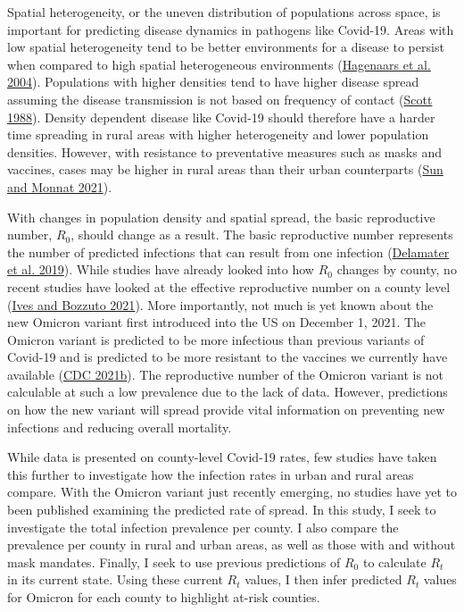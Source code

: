 \documentclass[
  12pt,
]{article}
\begin{document}
Spatial heterogeneity, or the uneven distribution of populations across space, is important for predicting disease dynamics in pathogens like Covid-19. Areas with low spatial heterogeneity tend to be better environments for a disease to persist when compared to high spatial heterogeneous environments (\protect\hyperlink{ref-hagenaars_spatial_2004}{Hagenaars et al. 2004}). Populations with higher densities tend to have higher disease spread assuming the disease transmission is not based on frequency of contact (\protect\hyperlink{ref-scott_impact_1988}{Scott 1988}). Density dependent disease like Covid-19 should therefore have a harder time spreading in rural areas with higher heterogeneity and lower population densities. However, with resistance to preventative measures such as masks and vaccines, cases may be higher in rural areas than their urban counterparts (\protect\hyperlink{ref-sun_rural-urban_2021}{Sun and Monnat 2021}).

With changes in population density and spatial spread, the basic reproductive number, \(R_0\), should change as a result. The basic reproductive number represents the number of predicted infections that can result from one infection (\protect\hyperlink{ref-delamater_complexity_2019}{Delamater et al. 2019}). While studies have already looked into how \(R_0\) changes by county, no recent studies have looked at the effective reproductive number on a county level (\protect\hyperlink{ref-ives_estimating_2021}{Ives and Bozzuto 2021}). More importantly, not much is yet known about the new Omicron variant first introduced into the US on December 1, 2021. The Omicron variant is predicted to be more infectious than previous variants of Covid-19 and is predicted to be more resistant to the vaccines we currently have available (\protect\hyperlink{ref-cdc_omicron_2021}{CDC 2021b}). The reproductive number of the Omicron variant is not calculable at such a low prevalence due to the lack of data. However, predictions on how the new variant will spread provide vital information on preventing new infections and reducing overall mortality.

While data is presented on county-level Covid-19 rates, few studies have taken this further to investigate how the infection rates in urban and rural areas compare. With the Omicron variant just recently emerging, no studies have yet to been published examining the predicted rate of spread. In this study, I seek to investigate the total infection prevalence per county. I also compare the prevalence per county in rural and urban areas, as well as those with and without mask mandates. Finally, I seek to use previous predictions of \(R_0\) to calculate \(R_t\) in its current state. Using these current \(R_t\) values, I then infer predicted \(R_t\) values for Omicron for each county to highlight at-risk counties.
\end{document}
